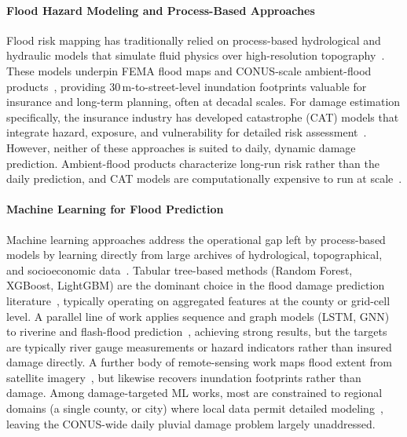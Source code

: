 \paragraph{Flood Hazard Modeling and Process-Based Approaches}
Flood risk mapping has traditionally relied on process-based hydrological and hydraulic models that simulate fluid physics over high-resolution topography~\cite{kumar_comprehensive_2023,bates_simple_2000}.
%
These models underpin FEMA flood maps and CONUS-scale ambient-flood products~\cite{fema_flood_zone_2021,bates_combined_2021,woznicki_development_2019,wing_30_2024}, providing 30\,m-to-street-level inundation footprints valuable for insurance and long-term planning, often at decadal scales.
%
For damage estimation specifically, the insurance industry has developed catastrophe (CAT) models that integrate hazard, exposure, and vulnerability for detailed risk assessment~\cite{zanardo_introduction_2022}.
%
However, neither of these approaches is suited to daily, dynamic damage prediction. 
%
Ambient-flood products characterize long-run risk rather than the daily prediction, and CAT models are computationally expensive to run at scale~\cite{bates_flood_2022,kazadi_floodgnn-gru_2024}.


\paragraph{Machine Learning for Flood Prediction}
Machine learning approaches address the operational gap left by process-based models by learning directly from large archives of hydrological, topographical, and socioeconomic data~\cite{oddo_deep_2024,collins_predicting_2022,alipour_leveraging_2020,liao_fast_2023}.
%
Tabular tree-based methods (Random Forest, XGBoost, LightGBM) are the dominant choice in the flood damage prediction literature~\cite{yang_predicting_2022,collins_predicting_2022,garcia_reconstructing_2025,alipour_leveraging_2020}, typically operating on aggregated features at the county or grid-cell level.
%
A parallel line of work applies sequence and graph models (LSTM, GNN) to riverine and flash-flood prediction~\cite{nearing_global_2024,tran_ai_2025,kazadi_floodgnn-gru_2024,sarkar_hydrogat_2025,taghizadeh_interpretable_2024,moishin_designing_2021}, achieving strong results, but the targets are typically river gauge measurements or hazard indicators rather than insured damage directly.
%
A further body of remote-sensing work maps flood extent from satellite imagery~\cite{rambour_sen12-flood_2020,Bonafilia_2020_CVPR_Workshops,puttinaovarat_flood_2020}, but likewise recovers inundation footprints rather than damage.
%
Among damage-targeted ML works, most are constrained to regional domains (a single county, or city) where local data permit detailed modeling~\cite{liu_flooddamagecast_2024,zhang_high_2023,shu_assessing_2026}, leaving the CONUS-wide daily pluvial damage problem largely unaddressed.

